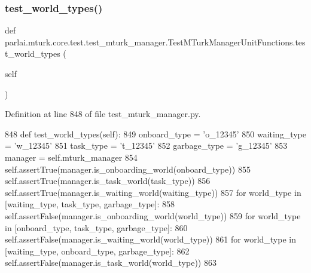 \mbox{\label{classparlai_1_1mturk_1_1core_1_1test_1_1test__mturk__manager_1_1TestMTurkManagerUnitFunctions_ae23e0218e51023445d2dc096086205c0}} 
\subsubsection{\texorpdfstring{test\+\_\+world\+\_\+types()}{test\_world\_types()}}
{\footnotesize\ttfamily def parlai.\+mturk.\+core.\+test.\+test\+\_\+mturk\+\_\+manager.\+Test\+M\+Turk\+Manager\+Unit\+Functions.\+test\+\_\+world\+\_\+types (\begin{DoxyParamCaption}\item[{}]{self }\end{DoxyParamCaption})}



Definition at line 848 of file test\+\_\+mturk\+\_\+manager.\+py.


\begin{DoxyCode}
848     \textcolor{keyword}{def }test\_world\_types(self):
849         onboard\_type = \textcolor{stringliteral}{'o\_12345'}
850         waiting\_type = \textcolor{stringliteral}{'w\_12345'}
851         task\_type = \textcolor{stringliteral}{'t\_12345'}
852         garbage\_type = \textcolor{stringliteral}{'g\_12345'}
853         manager = self.mturk\_manager
854         self.assertTrue(manager.is\_onboarding\_world(onboard\_type))
855         self.assertTrue(manager.is\_task\_world(task\_type))
856         self.assertTrue(manager.is\_waiting\_world(waiting\_type))
857         \textcolor{keywordflow}{for} world\_type \textcolor{keywordflow}{in} [waiting\_type, task\_type, garbage\_type]:
858             self.assertFalse(manager.is\_onboarding\_world(world\_type))
859         \textcolor{keywordflow}{for} world\_type \textcolor{keywordflow}{in} [onboard\_type, task\_type, garbage\_type]:
860             self.assertFalse(manager.is\_waiting\_world(world\_type))
861         \textcolor{keywordflow}{for} world\_type \textcolor{keywordflow}{in} [waiting\_type, onboard\_type, garbage\_type]:
862             self.assertFalse(manager.is\_task\_world(world\_type))
863 
\end{DoxyCode}


